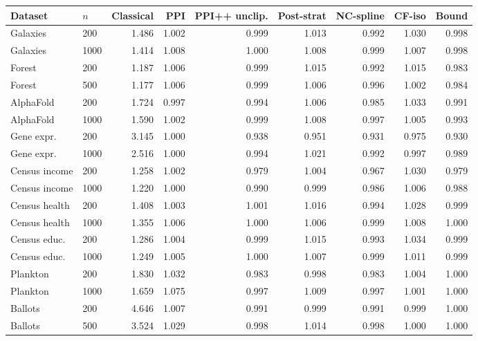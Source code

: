 \begin{tabular}{llrrrrrrr}
\toprule
Dataset & $n$ & Classical & PPI & PPI++ unclip. & Post-strat & NC-spline & CF-iso & Bound \\
\midrule
Galaxies & 200 & 1.486 & 1.002 & 0.999 & 1.013 & 0.992 & 1.030 & 0.998 \\
Galaxies & 1000 & 1.414 & 1.008 & 1.000 & 1.008 & 0.999 & 1.007 & 0.998 \\
Forest & 200 & 1.187 & 1.006 & 0.999 & 1.015 & 0.992 & 1.015 & 0.983 \\
Forest & 500 & 1.177 & 1.006 & 0.999 & 1.006 & 0.996 & 1.002 & 0.984 \\
AlphaFold & 200 & 1.724 & 0.997 & 0.994 & 1.006 & 0.985 & 1.033 & 0.991 \\
AlphaFold & 1000 & 1.590 & 1.002 & 0.999 & 1.008 & 0.997 & 1.005 & 0.993 \\
Gene expr. & 200 & 3.145 & 1.000 & 0.938 & 0.951 & 0.931 & 0.975 & 0.930 \\
Gene expr. & 1000 & 2.516 & 1.000 & 0.994 & 1.021 & 0.992 & 0.997 & 0.989 \\
Census income & 200 & 1.258 & 1.002 & 0.979 & 1.004 & 0.967 & 1.030 & 0.979 \\
Census income & 1000 & 1.220 & 1.000 & 0.990 & 0.999 & 0.986 & 1.006 & 0.988 \\
Census health & 200 & 1.408 & 1.003 & 1.001 & 1.016 & 0.994 & 1.028 & 0.999 \\
Census health & 1000 & 1.355 & 1.006 & 1.000 & 1.006 & 0.999 & 1.008 & 1.000 \\
Census educ. & 200 & 1.286 & 1.004 & 0.999 & 1.015 & 0.993 & 1.034 & 0.999 \\
Census educ. & 1000 & 1.249 & 1.005 & 1.000 & 1.007 & 0.999 & 1.011 & 0.999 \\
Plankton & 200 & 1.830 & 1.032 & 0.983 & 0.998 & 0.983 & 1.004 & 1.000 \\
Plankton & 1000 & 1.659 & 1.075 & 0.997 & 1.009 & 0.997 & 1.001 & 1.000 \\
Ballots & 200 & 4.646 & 1.007 & 0.991 & 0.999 & 0.991 & 0.999 & 1.000 \\
Ballots & 500 & 3.524 & 1.029 & 0.998 & 1.014 & 0.998 & 1.000 & 1.000 \\
\bottomrule
\end{tabular}